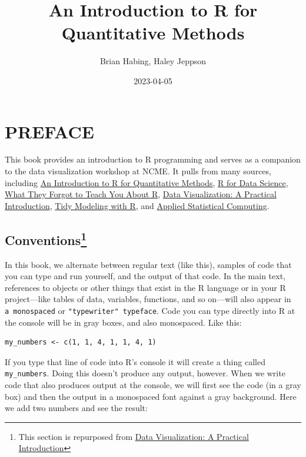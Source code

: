\documentclass[
]{book}
\title{An Introduction to R for Quantitative Methods}
\author{Brian Habing, Haley Jeppson}
\date{2023-04-05}
\begin{document}
\maketitle

{
\setcounter{tocdepth}{1}
\tableofcontents
}
\hypertarget{preface}{%
\chapter*{PREFACE}\label{preface}}

This book provides an introduction to R programming and serves as a companion to the data visualization workshop at NCME. It pulls from many sources, including \href{https://people.stat.sc.edu/habing/RforQM/RforQM.htm}{An Introduction to R for Quantitative Methods}, \href{https://r4ds.had.co.nz/}{R for Data Science}, \href{https://rstats.wtf/}{What They Forgot to Teach You About R}, \href{https://socviz.co/}{Data Visualization: A Practical Introduction}, \href{https://www.tmwr.org/}{Tidy Modeling with R}, and \href{https://stat480-at-isu.github.io/schedule.html}{Applied Statistical Computing}.

\hypertarget{conventions}{%
\section*{\texorpdfstring{Conventions\footnote{This section is repurposed from \href{https://socviz.co/}{Data Visualization: A Practical Introduction}}}{Conventions}}\label{conventions}}

In this book, we alternate between regular text (like this), samples of code that you can type and run yourself, and the output of that code. In the main text, references to objects or other things that exist in the R language or in your R project---like tables of data, variables, functions, and so on---will also appear in \texttt{a\ monospaced} or \texttt{"typewriter"\ typeface}. Code you can type directly into R at the console will be in gray boxes, and also monospaced. Like this:

\begin{verbatim}
my_numbers <- c(1, 1, 4, 1, 1, 4, 1)
\end{verbatim}

If you type that line of code into R's console it will create a thing called \texttt{my\_numbers}. Doing this doesn't produce any output, however. When we write code that also produces output at the console, we will first see the code (in a gray box) and then the output in a monospaced font against a gray background. Here we add two numbers and see the result:
\end{document}

